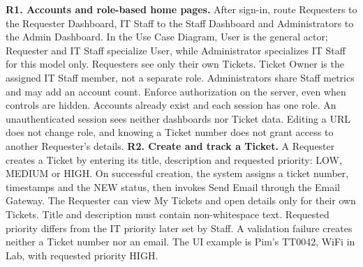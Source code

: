 \begin{contenttable}

{\textbf{R1. Accounts and role-based home pages.} After sign-in, route Requesters to the Requester Dashboard, IT Staff to the Staff Dashboard and Administrators to the Admin Dashboard. In the Use Case Diagram, User is the general actor; Requester and IT Staff specialize User, while Administrator specializes IT Staff for this model only. Requesters see only their own Tickets. Ticket Owner is the assigned IT Staff member, not a separate role. Administrators share Staff metrics and may add an account count. Enforce authorization on the server, even when controls are hidden. Accounts already exist and each session has one role. An unauthenticated session sees neither dashboards nor Ticket data. Editing a URL does not change role, and knowing a Ticket number does not grant access to another Requester’s details.}
{\textbf{R2. Create and track a Ticket.} A Requester creates a Ticket by entering its title, description and requested priority: LOW, MEDIUM or HIGH. On successful creation, the system assigns a ticket number, timestamps and the NEW status, then invokes Send Email through the Email Gateway. The Requester can view My Tickets and open details only for their own Tickets. Title and description must contain non-whitespace text. Requested priority differs from the IT priority later set by Staff. A validation failure creates neither a Ticket number nor an email. The UI example is Pim’s TT0042, WiFi in Lab, with requested priority HIGH.}

\end{contenttable}
